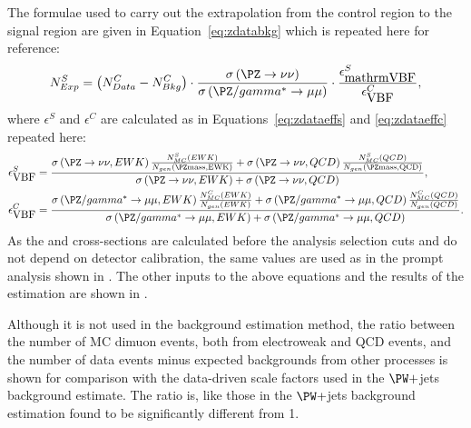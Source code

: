 The formulae used to carry out the extrapolation from the control region to the signal region are given in Equation~\ref{eq:zdatabkg} which is repeated here for reference:
\begin{equation}
  \label{eq:zdatabkgrep}
  N^{S}_{Exp}=\left(N^{C}_{Data}-N^{C}_{Bkg}\right)\cdot\frac{\sigma\left(\PZ\rightarrow\nu\nu\right)}{\sigma\left(\PZ/\gamma^{*}\rightarrow\mu\mu\right)}\cdot\frac{\epsilon^{S}_{\mbox{mathrm{VBF}}}}{\epsilon^{C}_{\mbox{VBF}}},
\end{equation}
where $\epsilon^{S}$ and $\epsilon^{C}$ are calculated as in Equations~\ref{eq:zdataeffs} and \ref{eq:zdataeffc} repeated here:
\begin{align}
  \label{eq:zdataeffsrep}
  \epsilon^{S}_{\mbox{VBF}}&=\frac{ \sigma\left(\PZ\rightarrow\nu\nu,EWK\right) \frac{N^{S}_{MC}\left(EWK\right)} {N_{gen}\left(\PZ \rm{mass},EWK\right)} + \sigma\left(\PZ\rightarrow\nu\nu,QCD\right) \frac{N^{S}_{MC}\left(QCD\right)} {N_{gen}\left(\PZ \rm{mass},QCD\right)} } {\sigma\left(\PZ\rightarrow\nu\nu,EWK\right) + \sigma\left(\PZ\rightarrow\nu\nu,QCD\right)},\\
  \label{eq:zdataeffcrep}
  \epsilon^{C}_{\mbox{VBF}}&=\frac{  \sigma\left(\PZ/\gamma^{*}\rightarrow\mu\mu,EWK\right) \frac{N^{C}_{MC}\left(EWK\right)} {N_{gen}\left(EWK\right)} + \sigma\left(\PZ/\gamma^{*}\rightarrow\mu\mu,QCD\right) \frac{N^{C}_{MC}\left(QCD\right)} {N_{gen}\left(QCD\right)}  }{\sigma\left(\PZ/\gamma^{*}\rightarrow\mu\mu,EWK\right)+\sigma\left(\PZ/\gamma^{*}\rightarrow\mu\mu,QCD\right)}.
\end{align}
As the \Zmumu and \Znunu cross-sections are calculated before the analysis selection cuts and do not depend on detector calibration, the same values are used as in the prompt analysis shown in . The other inputs to the above equations and the results of the estimation are shown in .

Although it is not used in the \Znunu background estimation method, the ratio between the number of \ac{MC} dimuon events, both from electroweak and \ac{QCD} events, and the number of data events minus expected backgrounds from other processes is shown for comparison with the data-driven scale factors used in the $\PW+$jets background estimate. The ratio is, like those in the $\PW+$jets background estimation found to be significantly different from 1. 


